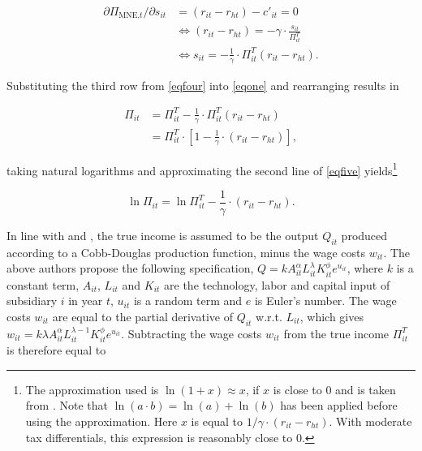 \documentclass[10pt,twocolumn,oneside,cmyk]{article}
\begin{document}
\begin{equation}\label{eqfour}
 \begin{split}
  \partial \Pi_{\text{MNE,$t$}}/\partial s_{it} &=(r_{it}-r_{ht})-c'_{it}=0\\
	& \Leftrightarrow (r_{it}-r_{ht})=-\gamma \cdot \frac{s_{it}}{\Pi_{it}^T}\\
	& \Leftrightarrow s_{it}=-\frac{1}{\gamma} \cdot \Pi_{it}^T(r_{it}-r_{ht}).
 \end{split}
\end{equation}

Substituting the third row from \cref{eqfour} into \cref{eqone} and rearranging results in

\begin{equation}\label{eqfive}
 \begin{split}
  \Pi_{it} &=\Pi_{it}^T-\frac{1}{\gamma}\cdot\Pi_{it}^T(r_{it}-r_{ht})\\
	& = \Pi_{it}^T \cdot \left[1-\frac{1}{\gamma} \cdot (r_{it}-r_{ht}) \right],
 \end{split}
\end{equation}

taking natural logarithms and approximating the second line of \cref{eqfive} yields\footnote{The approximation used is $\ln (1+x) \approx x$, if $x$ is close to 0 and is taken from \textcite[1169]{huizinga_international_2008}. Note that $\ln(a\cdot b)=\ln(a)+\ln(b)$ has been applied before using the approximation. Here $x$ is equal to $1/\gamma \cdot (r_{it}-r_{ht})$. With moderate tax differentials, this expression is reasonably close to 0.}

\begin{equation}\label{eqsix}
 \ln \Pi_{it} = \ln \Pi_{it}^T-\frac{1}{\gamma}\cdot(r_{it}-r_{ht}).
\end{equation}

In line with \textcite[160-161]{hines_fiscal_1994} and \textcite[1169]{huizinga_international_2008}, the true income is assumed to be the output $Q_{it}$ produced according to a Cobb-Douglas production function, minus the wage costs $w_{it}$. The above authors propose the following specification,
$Q=kA_{it}^\alpha L_{it}^\lambda K_{it}^\phi e^{u_{it}}$, where $k$ is a constant term, $A_{it}$, $L_{it}$ and $K_{it}$ are the technology, labor and capital input of subsidiary $i$ in year $t$, $u_{it}$ is a random term and $e$ is Euler's number. The wage costs $w_{it}$ are equal to the partial derivative of $Q_{it}$ w.r.t. $L_{it}$, which gives $w_{it}=k\lambda A_{it}^\alpha L_{it}^{\lambda-1} K_{it}^\phi e^{u_{it}}$. Subtracting the wage costs $w_{it}$ from the true income $\Pi_{it}^T$ is therefore equal to
\end{document}
